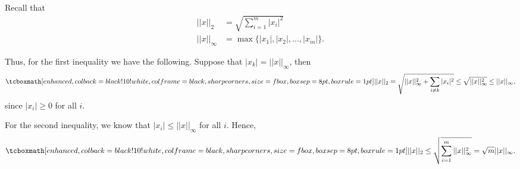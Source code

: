 \def\duedate{09/29/22}
\def\HWnum{1}


\setlength{\headheight}{14.9998pt}
\addtolength{\topmargin}{-2.49998pt}


    

Recall that 
\begin{align}
    \label{eq:norm-def}
    ||x||_{2} &= \sqrt{\sum_{i=1}^{m} |x_{i}|^{2}} \\
    ||x||_{\infty} &= \max \{ |x_1|,|x_2|, \ldots, |x_{m}| \} 
.\end{align}

Thus, for the first inequality we have the following.
Suppose that $|x_{k}| = ||x||_{\infty}$, then
\begin{eqnarray}
    \label{eq:derive-1st-inequality}
    \eqbox{
    ||x||_{2} = \sqrt{||x||_{\infty}^2 + \sum_{i \ne k} |x_{i}|^2} \leq \sqrt{||x||_{\infty}^2} \leq ||x||_{\infty}
}
,\end{eqnarray}
since $|x_{i}| \geq 0$ for all $i$.

For the second inequality, we know that $|x_{i}| \leq ||x||_{\infty}$ for all $i$.
Hence,
\begin{eqnarray}
    \label{eq:derive-2nd-inequality}
    \eqbox{
    ||x||_{2} \leq \sqrt{\sum_{i=1}^{m} ||x||_{\infty}^2} = \sqrt{m}||x||_{\infty} 
}
.\end{eqnarray}




